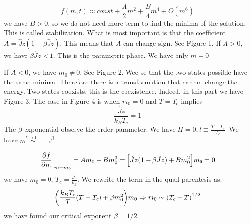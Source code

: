 \documentclass[../main/main.tex]{subfiles}
\begin{document}

\begin{equation}
  f (m,t) \approx const + \frac{A}{2} m^2 + \frac{B}{4} m^4 + O(m^6)
\end{equation}
we have \( B>0 \), so we do not need more term to find the minima of the solution. This is called stabilization. What is most important is that the coefficient \( A = \hat{J} z (1- \beta \hat{J} z )  \). This means that \emph{A} can change sign. See Figure 1.
If \( A > 0 \), we have \( \beta \hat{J} z < 1  \). This is the parametric phase. We have only \( m=0 \)

If \( A < 0 \), we have \( m_0 \neq 0 \). See Figure 2. Wee se that the two states possible have the same minima. Therefore there is a transformation that cannot change the energy. Two states coexists, this is the coexistence. Indeed, in this part we have Figure 3.
The case in Figure 4   is when \( m_0 = 0 \) and \( T = T_c \) implies
\begin{equation}
  \frac{\hat{J}z }{k_B T_c} = 1
\end{equation}
The \( \beta  \) exponential observe the order parameter.  We have \( H=0, t \equiv \frac{T-T_c}{T_c} \).
We have \( m \overset{t \rightarrow 0^-}{\sim } -t^ \beta  \)

\begin{equation}
  \eval{\pdv{f}{m} }_{m=m_0} = A m_0 + B m_0^3 = \qty[ \hat{J} z ( 1- \beta \hat{J} z ) + B m_0^2]m_0 = 0
\end{equation}
we have \( m_0=0 \), \( T_c = \frac{\hat{J}z }{k_B } \). We rewrite the term in the quad parentesis as:
\begin{equation}
  \qty(\frac{k_B T_c}{T} (T-T_c) + \beta m_0^2)m_0 \Rightarrow m_0 \sim \qty(T_c-T)^{1/2}
\end{equation}
we have found our critical exponent \( \beta = 1/2 \).
\end{document}
